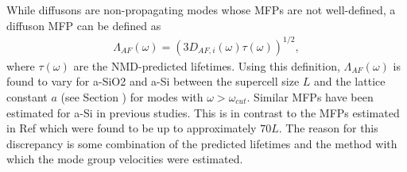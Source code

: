\documentclass[aps,prb,twocolumn,superscriptaddress,footinbib,amsmath,amssymb,floatfix]{revtex4}
\begin{document}
While diffusons are non-propagating modes whose MFPs are not 
well-defined, a diffuson MFP can be defined as
\begin{equation}\label{EQ:LambdaAF}
\begin{split}
\Lambda_{AF}(\omega) = (3D_{AF,i}(\omega)\tau(\omega))^{1/2},
\end{split}
\end{equation}
where $\tau(\omega)$ are the NMD-predicted lifetimes. Using this 
definition, $\Lambda_{AF}(\omega)$ is found to vary 
for a-SiO2 and a-Si between 
the supercell size $L$ and the lattice constant $a$ 
(see Section ) for modes with $\omega > \omega_{cut}$. 
Similar MFPs have been estimated for a-Si in 
previous studies.\cite{feldman_thermal_1993,feldman_numerical_1999} 
This is in contrast to the MFPs estimated in Ref 
which were found to be up to approximately $70 L$. The reason 
for this discrepancy is some combination of the predicted lifetimes 
and the method with which the mode group velocities were estimated.
\cite{he_heat_2011}
\end{document}
